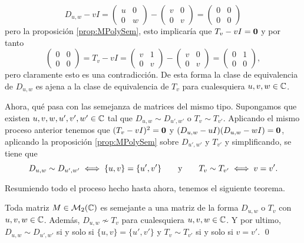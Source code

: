 \[
  D_{u,w} - vI = \begin{pmatrix} u & 0 \\ 0 & w \end{pmatrix} - \begin{pmatrix} v & 0 \\ 0 & v \end{pmatrix}
  = \begin{pmatrix} 0 & 0 \\ 0 & 0 \end{pmatrix}
\]
pero la proposición \ref{prop:MPolySem}, esto implicaría que $T_v - vI  = \mathbf{0}$ y por tanto
\[
  \begin{pmatrix} 0 & 0 \\ 0 & 0 \end{pmatrix} = T_v - vI = \begin{pmatrix} v & 1 \\ 0 & v \end{pmatrix} - \begin{pmatrix} v & 0 \\ 0 & v \end{pmatrix} = \begin{pmatrix}
    0 & 1 \\ 0 & 0 \end{pmatrix},
\]
pero claramente esto es una contradicción. De esta forma la clase de equivalencia de $D_{u,w}$ es ajena a la clase de equivalencia de $T_v$ para cualesquiera $u,v,w \in \mathbb{C}$.

Ahora, qué pasa con las semejanza de matrices del mismo tipo. Supongamos que existen $u, v, w, u', v', w' \in \mathbb{C}$ tal que $D_{u,w} \sim D_{u',w'}$ o $T_v \sim T_{v'}$. Aplicando el mismo proceso anterior tenemos que $(T_v - vI)^2 = \mathbf{0}$ y $(D_{u,w} - uI)(D_{u,w} - wI) = \mathbf{0}$, aplicando la proposición \ref{prop:MPolySem} sobre $D_{u',w'}$ y $T_{v'}$ y simplificando, se tiene que 
\[
  D_{u,w} \sim D_{u',w'} \iff \{u,v\} = \{u',v'\}
    \qquad\text{y}\qquad
  T_v \sim T_{v'} \iff v = v'.
\]

Resumiendo todo el proceso hecho hasta ahora, tenemos el siguiente teorema.
\begin{teor}
  Toda matriz $M \in \mathcal{M}_2(\mathbb{C})$ es semejante a una matriz de la forma $D_{u,w}$ o $T_v$ con $u,v,w \in \mathbb{C}$. Además, $D_{u,w} \nsim T_v$ para cualesquiera $u,v,w \in \mathbb{C}$. Y por ultimo, $D_{u,w} \sim D_{u',w'}$ si y solo si $\{u,v\} = \{u',v'\}$ y $T_v \sim T_{v'}$ si y solo si $v = v'$. \qed
\end{teor}